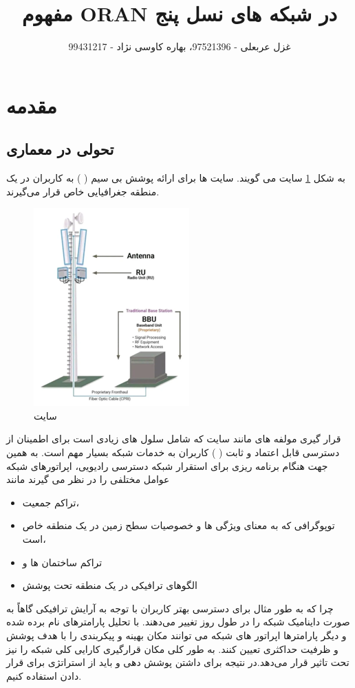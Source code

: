 \documentclass[landscape, 12pt]{report}
\title{مفهوم
	ORAN
	در شبکه های نسل پنج
}
\author{غزل عربعلی - 97521396، بهاره کاوسی نژاد - 99431217}
\begin{document}
\maketitle
{}
\chapter*{مقدمه}

\section*{تحولی در معماری
	  }
به شکل \ref{fig:site} سایت می گویند. سایت ها برای ارائه پوشش بی سیم
 (
 ) به کاربران در یک منطقه جغرافیایی خاص قرار می‌گیرند.
\begin{figure}[ht]
	\centering
	\includegraphics[height=.3\linewidth]{Pic/Picture1}
	\caption{سایت}
	\label{fig:site}
\end{figure}
قرار گیری مولفه های
   مانند سایت که شامل سلول های زیادی است برای اطمینان از دسترسی قابل اعتماد و ثابت             (
   ) کاربران به خدمات شبکه بسیار مهم است. به همین جهت هنگام برنامه ریزی برای استقرار شبکه دسترسی رادیویی، اپراتورهای شبکه عوامل مختلفی را در نظر می گیرند مانند
   \begin{itemize}
   	\item تراکم جمعیت،
   	\item توپوگرافی که به معنای ویژگی ها و خصوصیات سطح زمین در یک منطقه خاص است،
   	\item تراکم ساختمان ها و
   	\item الگوهای ترافیکی در یک منطقه تحت پوشش
   \end{itemize}
چرا که به طور مثال برای دسترسی بهتر کاربران با توجه به آرایش ترافیکی گاهاً به صورت داینامیک
  شبکه را در طول روز تغییر می‌دهند. با تحلیل پارامترهای نام برده شده و دیگر پارامترها اپراتور های شبکه می توانند مکان بهینه و پیکربندی
    را  با هدف پوشش و ظرفیت حداکثری تعیین کنند. به طور کلی مکان قرارگیری
      کارایی کلی شبکه را نیز تحت تاثیر قرار می‌دهد.در نتیجه برای داشتن پوشش دهی و
        باید از استراتژی برای قرار دادن
          استفاده کنیم.
\end{document}

